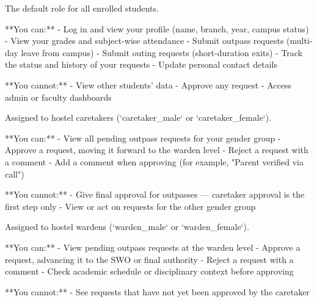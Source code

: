 \begin{tcolorbox}[colback=gray!5,colframe=primary,title=Documentation Note]

  
\begin{tcolorbox}[colback=gray!5,colframe=primary,title=Documentation Note]

    The default role for all enrolled students.

    **You can:**
    - Log in and view your profile (name, branch, year, campus status)
    - View your grades and subject-wise attendance
    - Submit outpass requests (multi-day leave from campus)
    - Submit outing requests (short-duration exits)
    - Track the status and history of your requests
    - Update personal contact details

    **You cannot:**
    - View other students' data
    - Approve any request
    - Access admin or faculty dashboards

  
\end{tcolorbox}


  
\begin{tcolorbox}[colback=gray!5,colframe=primary,title=Documentation Note]

    Assigned to hostel caretakers (`caretaker_male` or `caretaker_female`).

    **You can:**
    - View all pending outpass requests for your gender group
    - Approve a request, moving it forward to the warden level
    - Reject a request with a comment
    - Add a comment when approving (for example, "Parent verified via call")

    **You cannot:**
    - Give final approval for outpasses — caretaker approval is the first step only
    - View or act on requests for the other gender group

  
\end{tcolorbox}


  
\begin{tcolorbox}[colback=gray!5,colframe=primary,title=Documentation Note]

    Assigned to hostel wardens (`warden_male` or `warden_female`).

    **You can:**
    - View pending outpass requests at the warden level
    - Approve a request, advancing it to the SWO or final authority
    - Reject a request with a comment
    - Check academic schedule or disciplinary context before approving

    **You cannot:**
    - See requests that have not yet been approved by the caretaker


\end{tcolorbox}
\end{tcolorbox}
